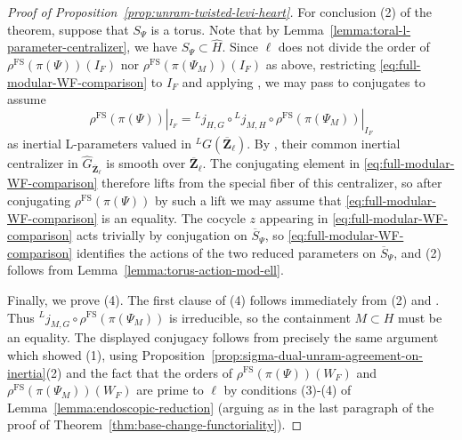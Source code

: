 \documentclass[reqno]{amsart}
\numberwithin{equation}{subsection}
\newcommand{\F}{\mathbf{F}}
\newcommand{\Q}{\mathbf{Q}}
\newcommand{\Z}{\mathbf{Z}}
\newcommand{\ol}[1]{\overline{#1}}
\newcommand{\wh}[1]{\widehat{#1}}
\newcommand{\ld}{{}^L}
\DeclareMathOperator{\FS}{FS}
\DeclareMathOperator{\Kal}{Kal}
\newtheorem{cor}[thm]{Corollary}
\theoremstyle{remark}
\numberwithin{equation}{subsection}
\numberwithin{figure}{subsection}
\begin{document}
\begin{proof}[Proof of Proposition~\ref{prop:unram-twisted-levi-heart}]
For conclusion (2) of the theorem, suppose that $S_\Psi$ is a torus. Note that by Lemma~\ref{lemma:toral-l-parameter-centralizer}, we have $S_\Psi \subset \wh H$. Since $\ell$ does not divide the order of $\rho^{\FS}(\pi(\Psi))(I_F)$ nor $\rho^{\FS}(\pi(\Psi_M))(I_F)$ as above, restricting \eqref{eq:full-modular-WF-comparison} to $I_F$ and applying \cite[Lemma~5.3.2]{Cot26b}, we may pass to conjugates to assume
\[
\rho^{\FS}(\pi(\Psi))|_{I_F} = \ld j_{H,G}\circ\ld j_{M,H} \circ \rho^{\FS}(\pi(\Psi_M))|_{I_F}
\]
as inertial L-parameters valued in $\ld G(\ol\Z_\ell)$. By \cite[Corollary 3.7]{BCT24}, their common inertial centralizer in $\wh G_{\ol\Z_\ell}$ is smooth over $\ol\Z_\ell$. The conjugating element in \eqref{eq:full-modular-WF-comparison} therefore lifts from the special fiber of this centralizer, so after conjugating $\rho^{\FS}(\pi(\Psi))$ by such a lift we may assume that \eqref{eq:full-modular-WF-comparison} is an equality. The cocycle $z$ appearing in \eqref{eq:full-modular-WF-comparison} acts trivially by conjugation on $\ol S_\Psi$, so \eqref{eq:full-modular-WF-comparison} identifies the actions of the two reduced parameters on $\ol S_\Psi$, and (2) follows from Lemma~\ref{lemma:torus-action-mod-ell}.

Finally, we prove (4). The first clause of (4) follows immediately from (2) and \cite[Lemma~10.1.9]{CF26a}. Thus $\ld j_{M,G}\circ\rho^{\FS}(\pi(\Psi_M))$ is irreducible, so the containment $M\subset H$ must be an equality. The displayed conjugacy follows from precisely the same argument which showed (1), using Proposition~\ref{prop:sigma-dual-unram-agreement-on-inertia}(2) and the fact that the orders of $\rho^{\FS}(\pi(\Psi))(W_F)$ and $\rho^{\FS}(\pi(\Psi_M))(W_F)$ are prime to $\ell$ by conditions (3)-(4) of Lemma~\ref{lemma:endoscopic-reduction} (arguing as in the last paragraph of the proof of Theorem~\ref{thm:base-change-functoriality}).
\end{proof}



\end{document}
